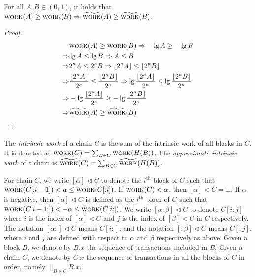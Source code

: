 \begin{lemma}\label{lemma:awork-rounding}
  For all $A, B \in (0, 1)$, it holds that
  $\textsc{work}(A) \geq \textsc{work}(B) \Rightarrow \widetilde{\textsc{work}}(A) \geq \widetilde{\textsc{work}}(B)$.
\end{lemma}
\begin{proof}
  \begin{align*}
                &\textsc{work}(A) \geq \textsc{work}(B) \Rightarrow -\lg A \geq -\lg B\\
    \Rightarrow &\lg A \leq \lg B \Rightarrow A \leq B\\
    \Rightarrow &2^\kappa A \leq 2^\kappa B \Rightarrow \lfloor 2^\kappa A \rfloor \leq \lfloor 2^\kappa B \rfloor\\
    \Rightarrow &\frac{\lfloor 2^\kappa A \rfloor}{2^\kappa} \leq \frac{\lfloor 2^\kappa B \rfloor}{2^\kappa} \Rightarrow \lg \frac{\lfloor 2^\kappa A \rfloor}{2^\kappa} \leq \lg \frac{\lfloor 2^\kappa B \rfloor}{2^\kappa}\\
    \Rightarrow &-\lg \frac{\lfloor 2^\kappa A \rfloor}{2^\kappa} \geq -\lg \frac{\lfloor 2^\kappa B \rfloor}{2^\kappa}\\
    \Rightarrow &\widetilde{\textsc{work}}(A) \geq \widetilde{\textsc{work}}(B)
  \end{align*}
  \Qed
\end{proof}

\begin{definition}
  The \emph{intrinsic work} of a chain
  $C$ is the sum of the
  intrinsic work of all blocks in $C$.
  It is denoted as $\textsc{work}(C) = \sum_{B \in C}{\textsc{work}(H(B))}$.
  The \emph{approximate intrinsic work} of a chain
  is $\widetilde{\textsc{work}}(C) = \sum_{B \in C}{\widetilde{\textsc{work}}(H(B))}$.
\end{definition}

\noindent
{}
For chain $C$, we write $[\alpha] \lhd C$
to denote the $i^\text{th}$ block of $C$ such that
$\textsc{work}(C[{:}{i - 1}]) < \alpha \leq \textsc{work}(C[{:}{i}])$.
If $\textsc{work}(C) < \alpha$, then $[\alpha] \lhd C = \bot$.
If $\alpha$ is negative, then $[\alpha] \lhd C$ is defined as
the $i^\text{th}$ block of $C$ such that
$\textsc{work}(C[{i - 1}{:}]) < -\alpha \leq \textsc{work}(C[{i}{:}])$.
We write $[{\alpha}{:}{\beta}] \lhd C$ to denote
$C[{i}{:}{j}]$ where $i$ is the index of $[\alpha] \lhd C$
and $j$ is the index of $[\beta] \lhd C$ in $C$ respectively.
The notation $[{\alpha}{:}] \lhd C$ means $C[{i}{:}]$,
and the notation $[{:}\beta] \lhd C$ means $C[{:}{j}]$,
where $i$ and $j$ are defined with respect to $\alpha$ and $\beta$
respectively as above.
Given a block $B$, we denote by $B.x$ the sequence of transactions
included in $B$.
Given a chain $C$, we denote by $C.x$
the sequence of transactions in all the blocks of $C$ in order, namely
${\big\lVert}_{B \in C} B.x$.

